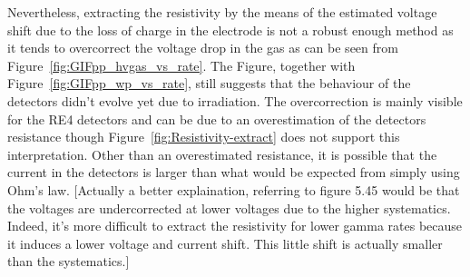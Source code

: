 	Nevertheless, extracting the resistivity by the means of the estimated voltage shift due to the loss of charge in the electrode is not a robust enough method as it tends to overcorrect the voltage drop in the gas as can be seen from Figure~\ref{fig:GIFpp_hvgas_vs_rate}. The Figure, together with Figure~\ref{fig:GIFpp_wp_vs_rate}, still suggests that the behaviour of the detectors didn't evolve yet due to irradiation. The overcorrection is mainly visible for the RE4 detectors and can be due to an overestimation of the detectors resistance though Figure~\ref{fig:Resistivity-extract} does not support this interpretation. Other than an overestimated resistance, it is possible that the current in the detectors is larger than what would be expected from simply using Ohm's law. [Actually a better explaination, referring to figure 5.45 would be that the voltages are undercorrected at lower voltages due to the higher systematics. Indeed, it's more difficult to extract the resistivity for lower gamma rates because it induces a lower voltage and current shift. This little shift is actually smaller than the systematics.]
	
